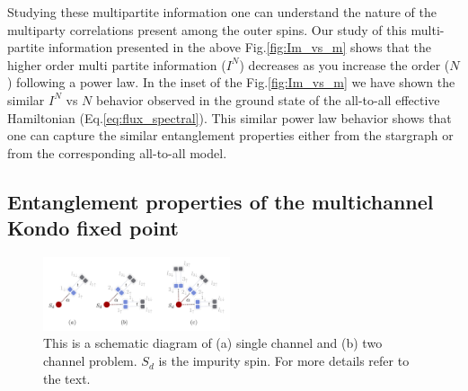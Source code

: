 \documentclass[reprint,prb,superscriptaddress]{revtex4-1}
\begin{document}
\noindent Studying these multipartite information one can understand the nature of the multiparty correlations present among the outer spins. Our study of this multi-partite information presented in the above Fig.\eqref{fig:Im_vs_m} shows that the higher order multi partite information ($I^N$) decreases as you increase the order ($N$) following a power law. In the inset of the Fig.\ref{fig:Im_vs_m} we have shown the similar $I^N$ vs $N$ behavior observed in the ground state of the all-to-all effective Hamiltonian (Eq.\ref{eq:flux_spectral}). This similar power law behavior shows that one can capture the similar entanglement properties either from the stargraph or from the corresponding all-to-all model.





\subsection{Entanglement properties of the multichannel Kondo fixed point}
\label{sec:EE_excitation}
\begin{figure}[!htpb]
\includegraphics[width=0.49\textwidth]{plt/hopping_fock_states}
\caption{This is a schematic diagram of (a) single channel and (b) two channel problem. $S_d$ is the impurity spin. For more details refer to the text.}
\label{fig:schematic_hopping}
\end{figure}
\end{document}
